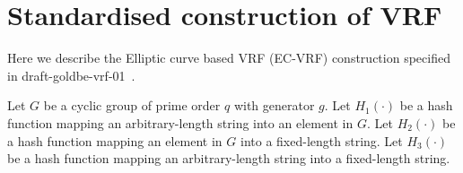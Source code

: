 \section{Standardised construction of VRF}
\label{vrf_standardised_construction}

Here we describe the Elliptic curve based VRF (EC-VRF) construction specified in draft-goldbe-vrf-01~\cite{goldberg2017draft}.

Let $G$ be a cyclic group of prime order $q$ with generator $g$.
Let $H_1(\cdot)$ be a hash function mapping an arbitrary-length string into an element in $G$.
Let $H_2(\cdot)$ be a hash function mapping an element in $G$ into a fixed-length string.
Let $H_3(\cdot)$ be a hash function mapping an arbitrary-length string into a fixed-length string.

\noindent{}

